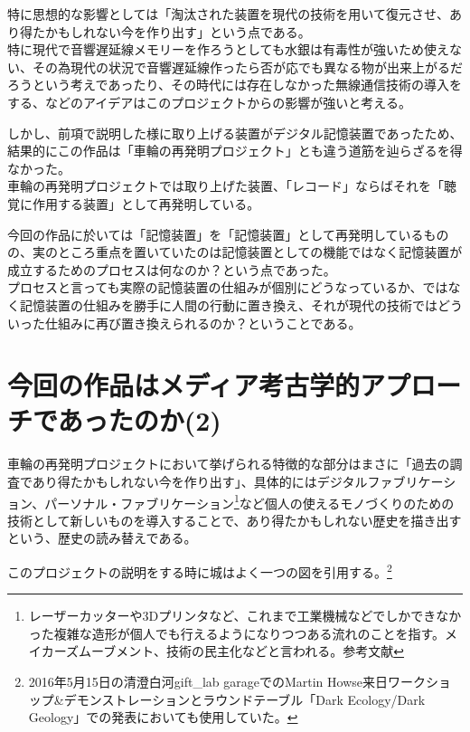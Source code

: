 \documentclass[a4paper,report]{jsbook}
\begin{document}
特に思想的な影響としては「淘汰された装置を現代の技術を用いて復元させ、あり得たかもしれない今を作り出す」という点である。\\
特に現代で音響遅延線メモリーを作ろうとしても水銀は有毒性が強いため使えない、その為現代の状況で音響遅延線作ったら否が応でも異なる物が出来上がるだろうという考えであったり、その時代には存在しなかった無線通信技術の導入をする、などのアイデアはこのプロジェクトからの影響が強いと考える。

しかし、前項で説明した様に取り上げる装置がデジタル記憶装置であったため、結果的にこの作品は「車輪の再発明プロジェクト」とも違う道筋を辿らざるを得なかった。\\
車輪の再発明プロジェクトでは取り上げた装置、「レコード」ならばそれを「聴覚に作用する装置」として再発明している。

今回の作品に於いては「記憶装置」を「記憶装置」として再発明しているものの、実のところ重点を置いていたのは記憶装置としての機能ではなく記憶装置が成立するためのプロセスは何なのか？という点であった。\\
プロセスと言っても実際の記憶装置の仕組みが個別にどうなっているか、ではなく記憶装置の仕組みを勝手に人間の行動に置き換え、それが現代の技術ではどういった仕組みに再び置き換えられるのか？ということである。

\section{今回の作品はメディア考古学的アプローチであったのか(2)}\label{ux4ecaux56deux306eux4f5cux54c1ux306fux30e1ux30c7ux30a3ux30a2ux8003ux53e4ux5b66ux7684ux30a2ux30d7ux30edux30fcux30c1ux3067ux3042ux3063ux305fux306eux304b2}

車輪の再発明プロジェクトにおいて挙げられる特徴的な部分はまさに「過去の調査であり得たかもしれない今を作り出す」、具体的にはデジタルファブリケーション、パーソナル・ファブリケーション\footnote{レーザーカッターや3Dプリンタなど、これまで工業機械などでしかできなかった複雑な造形が個人でも行えるようになりつつある流れのことを指す。メイカーズムーブメント、技術の民主化などと言われる。参考文献\autocite{fab:tanaka}}など個人の使えるモノづくりのための技術として新しいものを導入することで、あり得たかもしれない歴史を描き出すという、歴史の読み替えである。

このプロジェクトの説明をする時に城はよく一つの図を引用する。\footnote{2016年5月15日の清澄白河gift\_lab
  garageでのMartin
  Howse来日ワークショップ\&デモンストレーションとラウンドテーブル「Dark
  Ecology/Dark Geology」での発表においても使用していた。}\\
\autocite{soundstudies3}
\end{document}
